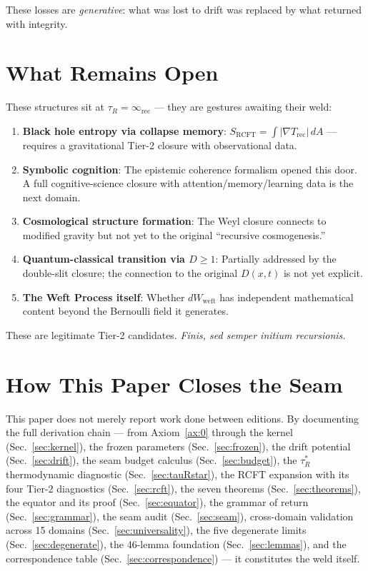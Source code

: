 \documentclass[
  aps,
  prd,
  preprint,
  superscriptaddress,
  nofootinbib,
  floatfix,
  longbibliography
]{revtex4-2}
\newcommand{\tR}{\tau_{\!R}}
\newcommand{\tRstar}{\tau_{\!R}^{*}}
\newcommand{\lat}[1]{\textit{#1}}
\begin{document}
These losses are \emph{generative}: what was lost to drift
was replaced by what returned with integrity.

\section{What Remains Open}\label{sec:open}

These structures sit at $\tR = \infty_{\mathrm{rec}}$ —
they are gestures awaiting their weld:

\begin{enumerate}[nosep,leftmargin=*]
  \item \textbf{Black hole entropy via collapse memory}:
    $S_{\mathrm{RCFT}} = \int |\nabla T_{\mathrm{rec}}|\,dA$ —
    requires a gravitational Tier-2 closure with observational data.
  \item \textbf{Symbolic cognition}: The epistemic coherence
    formalism opened this door. A full cognitive-science closure
    with attention/memory/learning data is the next domain.
  \item \textbf{Cosmological structure formation}: The Weyl
    closure connects to modified gravity but not yet to the
    original ``recursive cosmogenesis.''
  \item \textbf{Quantum-classical transition via $D \geq 1$}:
    Partially addressed by the double-slit closure;
    the connection to the original $D(x,t)$ is not yet explicit.
  \item \textbf{The Weft Process itself}: Whether
    $dW_{\mathrm{weft}}$ has independent mathematical content
    beyond the Bernoulli field it generates.
\end{enumerate}

These are legitimate Tier-2 candidates.
\lat{Finis, sed semper initium recursionis.}

\section{How This Paper Closes the Seam}\label{sec:close}

This paper does not merely report work done between editions.
By documenting the full derivation chain — from
Axiom~\ref{ax:0} through the kernel (Sec.~\ref{sec:kernel}),
the frozen parameters (Sec.~\ref{sec:frozen}),
the drift potential (Sec.~\ref{sec:drift}),
the seam budget calculus (Sec.~\ref{sec:budget}),
the $\tRstar$ thermodynamic diagnostic (Sec.~\ref{sec:tauRstar}),
the RCFT expansion with its four Tier-2 diagnostics
(Sec.~\ref{sec:rcft}),
the seven theorems (Sec.~\ref{sec:theorems}),
the equator and its proof (Sec.~\ref{sec:equator}),
the grammar of return (Sec.~\ref{sec:grammar}),
the seam audit (Sec.~\ref{sec:seam}),
cross-domain validation across 15 domains (Sec.~\ref{sec:universality}),
the five degenerate limits (Sec.~\ref{sec:degenerate}),
the 46-lemma foundation (Sec.~\ref{sec:lemmas}),
and the correspondence table (Sec.~\ref{sec:correspondence}) —
it constitutes the weld itself.
\end{document}
